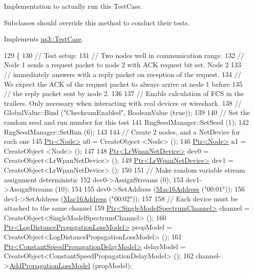 Implementation to actually run this Test\+Case. 

Subclasses should override this method to conduct their tests. 

Implements \hyperlink{classns3_1_1TestCase_a8ff74680cf017ed42011e4be51917a24}{ns3\+::\+Test\+Case}.


\begin{DoxyCode}
129 \{
130   \textcolor{comment}{// Test setup:}
131   \textcolor{comment}{// Two nodes well in communication range.}
132   \textcolor{comment}{// Node 1 sends a request packet to node 2 with ACK request bit set. Node 2}
133   \textcolor{comment}{// immediately answers with a reply packet on reception of the request.}
134   \textcolor{comment}{// We expect the ACK of the request packet to always arrive at node 1 before}
135   \textcolor{comment}{// the reply packet sent by node 2.}
136 
137   \textcolor{comment}{// Enable calculation of FCS in the trailers. Only necessary when interacting with real devices or
       wireshark.}
138   \textcolor{comment}{// GlobalValue::Bind ("ChecksumEnabled", BooleanValue (true));}
139 
140   \textcolor{comment}{// Set the random seed and run number for this test}
141   RngSeedManager::SetSeed (1);
142   RngSeedManager::SetRun (6);
143 
144   \textcolor{comment}{// Create 2 nodes, and a NetDevice for each one}
145   \hyperlink{classns3_1_1Ptr}{Ptr<Node>} n0 = CreateObject <Node> ();
146   \hyperlink{classns3_1_1Ptr}{Ptr<Node>} n1 = CreateObject <Node> ();
147 
148   \hyperlink{classns3_1_1Ptr}{Ptr<LrWpanNetDevice>} dev0 = CreateObject<LrWpanNetDevice> ();
149   \hyperlink{classns3_1_1Ptr}{Ptr<LrWpanNetDevice>} dev1 = CreateObject<LrWpanNetDevice> ();
150 
151   \textcolor{comment}{// Make random variable stream assignment deterministic}
152   dev0->AssignStreams (0);
153   dev1->AssignStreams (10);
154 
155   dev0->SetAddress (\hyperlink{classns3_1_1Mac16Address}{Mac16Address} (\textcolor{stringliteral}{"00:01"}));
156   dev1->SetAddress (\hyperlink{classns3_1_1Mac16Address}{Mac16Address} (\textcolor{stringliteral}{"00:02"}));
157 
158   \textcolor{comment}{// Each device must be attached to the same channel}
159   \hyperlink{classns3_1_1Ptr}{Ptr<SingleModelSpectrumChannel>} channel = 
      CreateObject<SingleModelSpectrumChannel> ();
160   \hyperlink{classns3_1_1Ptr}{Ptr<LogDistancePropagationLossModel>} propModel = 
      CreateObject<LogDistancePropagationLossModel> ();
161   \hyperlink{classns3_1_1Ptr}{Ptr<ConstantSpeedPropagationDelayModel>} delayModel = 
      CreateObject<ConstantSpeedPropagationDelayModel> ();
162   channel->\hyperlink{classns3_1_1SingleModelSpectrumChannel_a3d8c68e54e0e7659fdf715260d5613ac}{AddPropagationLossModel} (propModel);

\end{DoxyCode}
